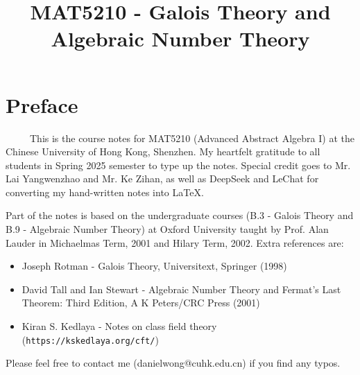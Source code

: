 \documentclass[11pt]{book}
\title{MAT5210 - Galois Theory and Algebraic Number Theory}
\date{}
\begin{document}
\maketitle

\chapter*{Preface}

\ \ \ \ \ This is the course notes for MAT5210 (Advanced Abstract Algebra I) at the Chinese University of Hong Kong, Shenzhen. My heartfelt gratitude to all students in Spring 2025 semester to type up the notes. Special credit goes to Mr. Lai Yangwenzhao and Mr. Ke Zihan, as well as DeepSeek and LeChat for converting my hand-written notes into LaTeX.

\medskip
Part of the notes is based on the undergraduate courses (B.3 - Galois Theory and B.9 - Algebraic Number Theory) at Oxford University taught by Prof. Alan Lauder in Michaelmas Term, 2001 and Hilary Term, 2002. Extra references are:
\begin{itemize}
    \item Joseph Rotman - Galois Theory, Universitext, Springer (1998)
    \item David Tall and Ian Stewart
 - Algebraic Number Theory and Fermat's Last Theorem: Third Edition, A K Peters/CRC Press (2001)
    \item Kiran S. Kedlaya - Notes on class field theory (\texttt{https://kskedlaya.org/cft/})
\end{itemize}


\medskip
Please feel free to contact me (danielwong@cuhk.edu.cn) if you find any typos.



\tableofcontents











\end{document}
